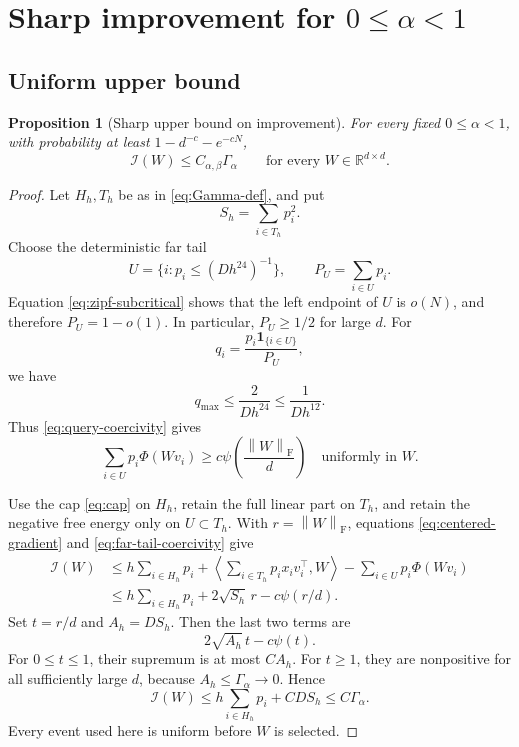 \documentclass[11pt]{article}
\newtheorem{proposition}[theorem]{Proposition}
\theoremstyle{remark}
\newcommand{\R}{\mathbb R}
\newcommand{\ip}[2]{\left\langle #1,#2\right\rangle}
\newcommand{\norm}[1]{\left\lVert #1\right\rVert}
\newcommand{\Frob}{\mathrm F}
\newcommand{\one}{\mathbf 1}
\newcommand{\cI}{\mathcal I}
\begin{document}
\section{Sharp improvement for \(0\leq\alpha<1\)}
\label{sec:subcritical}

\subsection{Uniform upper bound}

\begin{proposition}[Sharp upper bound on improvement]
\label{prop:sub-upper}
For every fixed \(0\leq\alpha<1\), with probability at least
\(1-d^{-c}-e^{-cN}\),
\[
 \cI(W)\leq C_{\alpha,\beta}\Gamma_\alpha
 \qquad\text{for every }W\in\R^{d\times d}.
\]
\end{proposition}

\begin{proof}
Let \(H_h,T_h\) be as in \eqref{eq:Gamma-def}, and put
\[
 S_h=\sum_{i\in T_h}p_i^2.
\]
Choose the deterministic far tail
\[
 U=\{i:p_i\leq(Dh^{24})^{-1}\},
 \qquad P_U=\sum_{i\in U}p_i.
\]
Equation \eqref{eq:zipf-subcritical} shows that the left endpoint of
\(U\) is \(o(N)\), and therefore \(P_U=1-o(1)\).  In particular,
\(P_U\geq1/2\) for large \(d\).  For
\[
 q_i=\frac{p_i\one_{\{i\in U\}}}{P_U},
\]
we have
\[
 q_{\max}\leq\frac{2}{Dh^{24}}\leq\frac1{Dh^{12}}.
\]
Thus \eqref{eq:query-coercivity} gives
\begin{equation}
 \sum_{i\in U}p_i\Phi(Wv_i)
 \geq c\psi\!\left(\frac{\norm W_{\Frob}}d\right)
 \quad\text{uniformly in }W.
 \label{eq:far-tail-coercivity}
\end{equation}

Use the cap \eqref{eq:cap} on \(H_h\), retain the full linear part on
\(T_h\), and retain the negative free energy only on \(U\subset T_h\).
With \(r=\norm W_{\Frob}\), equations
\eqref{eq:centered-gradient} and \eqref{eq:far-tail-coercivity} give
\begin{align}
 \cI(W)
 &\leq
 h\sum_{i\in H_h}p_i+
 \ip{\sum_{i\in T_h}p_ix_iv_i^\top}{W}
 -\sum_{i\in U}p_i\Phi(Wv_i)\\
 &\leq
 h\sum_{i\in H_h}p_i+
2\sqrt{S_h}\,r
-c\psi(r/d).
 \label{eq:sub-upper-master}
\end{align}
Set \(t=r/d\) and \(A_h=DS_h\).  Then the last two terms are
\[
 2\sqrt{A_h}\,t-c\psi(t).
\]
For \(0\leq t\leq1\), their supremum is at most \(C A_h\).
For \(t\geq1\), they are nonpositive for all sufficiently large \(d\),
because \(A_h\leq\Gamma_\alpha\to0\).  Hence
\[
 \cI(W)
 \leq h\sum_{i\in H_h}p_i+C DS_h
 \leq C\Gamma_\alpha.
\]
Every event used here is uniform before \(W\) is selected.
\end{proof}
\end{document}
